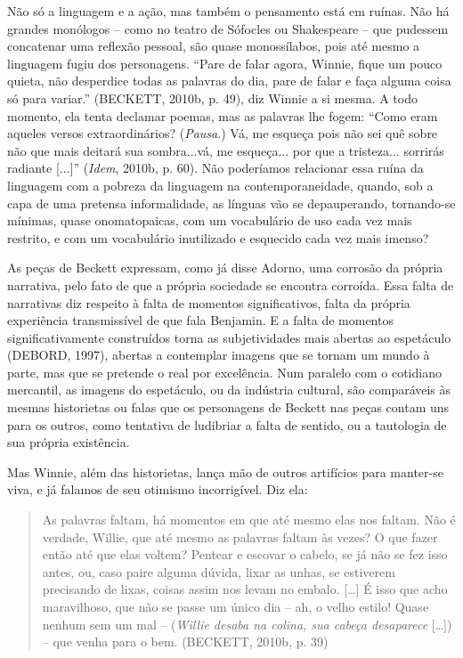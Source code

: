 Não só a linguagem e a ação, mas também o pensamento está em ruínas. Não
há grandes monólogos -- como no teatro de Sófocles ou Shakespeare -- que
pudessem concatenar uma reflexão pessoal, são quase monossílabos, pois
até mesmo a linguagem fugiu dos personagens. ``Pare de falar agora,
Winnie, fique um pouco quieta, não desperdice todas as palavras do dia,
pare de falar e faça alguma coisa só para variar.'' (BECKETT, 2010b, p.
49), diz Winnie a si mesma. A todo momento, ela tenta declamar poemas,
mas as palavras lhe fogem: ``Como eram aqueles versos extraordinários?
(\emph{Pausa}.) Vá, me esqueça pois não sei quê sobre não que mais
deitará sua sombra...vá, me esqueça... por que a tristeza... sorrirás
radiante {[}...{]}'' (\emph{Idem}, 2010b, p. 60). Não poderíamos
relacionar essa ruína da linguagem com a pobreza da linguagem na
contemporaneidade, quando, sob a capa de uma pretensa informalidade, as
línguas vão se depauperando, tornando-se mínimas, quase onomatopaicas,
com um vocabulário de uso cada vez mais restrito, e com um vocabulário
inutilizado e esquecido cada vez mais imenso?

As peças de Beckett expressam, como já disse Adorno, uma corrosão da
própria narrativa, pelo fato de que a própria sociedade se encontra
corroída. Essa falta de narrativas diz respeito à falta de momentos
significativos, falta da própria experiência transmissível de que fala
Benjamin. E a falta de momentos significativamente construídos torna as
subjetividades mais abertas ao espetáculo (DEBORD, 1997), abertas a
contemplar imagens que se tornam um mundo à parte, mas que se pretende o
real por excelência. Num paralelo com o cotidiano mercantil, as imagens
do espetáculo, ou da indústria cultural, são comparáveis às mesmas
historietas ou falas que os personagens de Beckett nas peças contam uns
para os outros, como tentativa de ludibriar a falta de sentido, ou a
tautologia de sua própria existência.

Mas Winnie, além das historietas, lança mão de outros artifícios para
manter-se viva, e já falamos de seu otimismo incorrigível. Diz ela:

\begin{quote}
As palavras faltam, há momentos em que até mesmo elas nos faltam. Não é
verdade, Willie, que até mesmo as palavras faltam às vezes? O que fazer
então até que elas voltem? Pentear e escovar o cabelo, se já não se fez
isso antes, ou, caso paire alguma dúvida, lixar as unhas, se estiverem
precisando de lixas, coisas assim nos levam no embalo. {[}\ldots{}{]} É
isso que acho maravilhoso, que não se passe um único dia -- ah, o velho
estilo! Quase nenhum sem um mal -- (\emph{Willie desaba na colina, sua
cabeça desaparece} {[}\ldots{}{]}) -- que venha para o bem. (BECKETT,
2010b, p. 39)
\end{quote}

